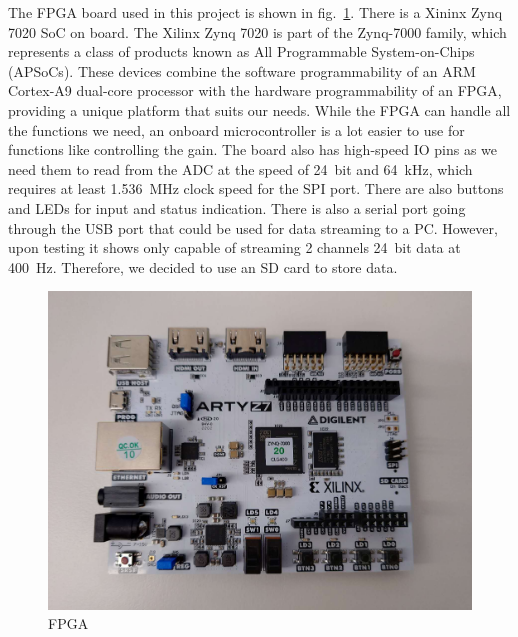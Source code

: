 The FPGA board used in this project is shown in fig.~\ref{fig_FPGA}.  There is a Xininx Zynq 7020 SoC on board.  The Xilinx Zynq 7020 is part of the Zynq-7000 family, which represents a class of products known as All Programmable System-on-Chips (APSoCs). These devices combine the software programmability of an ARM Cortex-A9 dual-core processor with the hardware programmability of an FPGA, providing a unique platform that suits our needs.  While the FPGA can handle all the functions we need, an onboard microcontroller is a lot easier to use for functions like controlling the gain.  The board also has high-speed IO pins as we need them to read from the ADC at the speed of \qty{24}{bit} and \qty{64}{kHz}, which requires at least \qty{1.536}{MHz} clock speed for the SPI port.  There are also buttons and LEDs for input and status indication.  There is also a serial port going through the USB port that could be used for data streaming to a PC.  However, upon testing it shows only capable of streaming 2 channels \qty{24}{bit} data at \qty{400}{Hz}.  Therefore, we decided to use an SD card to store data.

\begin{figure}[h]
\centering
\includegraphics[width=1\linewidth]{4-ANC_Sys/FPGA.jpg}
\caption{FPGA}
\label{fig_FPGA}
\end{figure}

